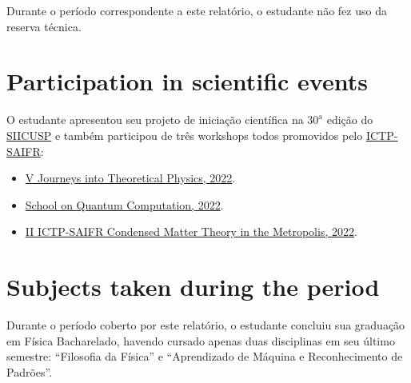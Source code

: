 \documentclass[12pt]{report}
\begin{document}
Durante o período correspondente a este relatório, o estudante não fez uso da reserva técnica.

\chapter{Participation in scientific events} \label{chp:particEvento}

O estudante apresentou seu projeto de iniciação científica na $30^{\text{a}}$ edição do \href{https://siicusp.prp.usp.br/pt/home/}{SIICUSP} e também participou de três workshops todos promovidos pelo \href{https://www.ictp-saifr.org/}{ICTP-SAIFR}:
\begin{itemize}
\item \href{http://journeys.ictp-saifr.org/}{V Journeys into Theoretical Physics, 2022}.
\item \href{https://www.ictp-saifr.org/qc2022/}{School on Quantum Computation, 2022}.
\item \href{https://www.ictp-saifr.org/cmtm2022/}{II ICTP-SAIFR Condensed Matter Theory in the Metropolis, 2022}.
\end{itemize}

\chapter{Subjects taken during the period}

Durante o período coberto por este relatório, o estudante concluiu sua graduação em Física Bacharelado, havendo cursado apenas duas disciplinas em seu último semestre: ``Filosofia da Física'' e ``Aprendizado de Máquina e Reconhecimento de Padrões''.

%




\end{document}
